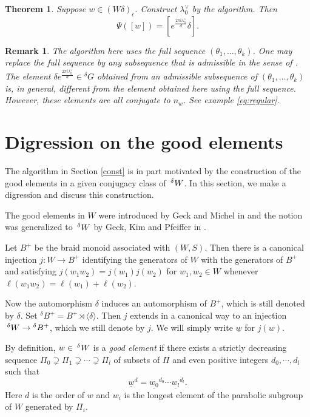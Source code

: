 \documentclass[10pt,leqno]{article}
\newtheorem{theorem}[equation]{Theorem}
\newtheorem{remark}[equation]{Remark}
{\theorembodyfont{\rmfamily}
\newtheorem{theoremplain}[equation]{Theorem}
\newtheorem{remarkplain}[equation]{Remark}
\newtheorem{editorialremarkplain}[equation]{Editorial Remark}
\newtheorem{exampleplain}[equation]{Example}
\newtheorem{corollaryplain}[equation]{Corollary}
}
\newcommand{\ch}[1]{#1^\vee}
\renewcommand{\sec}[1]{\section{#1}
\renewcommand{\theequation}{\thesection.\arabic{equation}}
  \setcounter{equation}{0}}
\newcommand{\e}{\text{e}}
\newcommand{\Wext}{\negthinspace\negthinspace\phantom{a}^\delta W}
\def\d{\delta}
\def\e{\epsilon}
\def\th{\theta}
\renewcommand{\sec}[1]{\section{#1}
\renewcommand{\theequation}{\thesection.\arabic{equation}}
  \setcounter{equation}{0}}
\begin{document}
\begin{theorem}
\label{t:main}
Suppose $w\in (W\delta)_\e$. Construct $\ch\lambda_0$ by the algorithm. Then
$$
\Psi([w])=[e^{\frac{2\pi i\ch\lambda_0}d}\delta].
$$
\end{theorem}
\begin{remark}
The algorithm here uses the full sequence $(\th_1, \ldots,
\th_k)$.
One may replace the full sequence by any subsequence that is
admissible in the sense of \cite[subsection 5.2]{he_nie_minimal_finite}. The element
$\delta e^{\frac{2\pi i\ch\lambda_0}d} \in {}^\d G$ obtained from an
admissible subsequence of $(\th_1, \ldots, \th_k)$ is, in general,
different from the element obtained here using the full
sequence. However, these elements are all conjugate to $n_w$. See
example \ref{eg:regular}.
\end{remark}



\sec{Digression on the good elements}

The algorithm in Section \ref{const} is in part motivated by
the construction of the good elements in a given conjugacy class of
$\Wext$. In this section, we make a digression and discuss this
construction.

The good elements in $W$ were introduced by Geck and Michel in
\cite{geck_michel_good} and the notion was generalized to $\Wext$ by Geck, Kim and
Pfeiffer in \cite{gkp}.

Let $B^+$ be the braid monoid associated with $(W,S)$. Then there is a
canonical injection $j:W\longrightarrow B^+$ identifying the
generators of $W$ with the generators of $B^+$ and
satisfying $j(w_1w_2)=j(w_1)j(w_2)$ for $w_1,w_2\in W$ whenever
$\ell(w_1w_2)=\ell(w_1)+\ell(w_2)$.

Now the automorphism $\delta$ induces an automorphism of $B^+$, which
is still denoted by $\delta$. Set ${}^{\delta} B^+=B^+ \rtimes
\langle\delta\rangle$. Then $j$ extends in a canonical way to an
injection $\Wext \to {}^{\delta} B^+$, which we still denote by
$j$. We will simply write $\underline w$ for $j(w)$.

By definition, $w \in \Wext$ is a {\it good element} if there exists a
strictly decreasing sequence $\Pi_0 \supsetneq \Pi_1 \supsetneq \cdots
\supsetneq \Pi_l$ of subsets of $\Pi$ and even positive integers
$d_0,\cdots,d_l$ such
that $${\underline{w}}^d=\underline{w_0}^{d_0}\cdots\underline{w_l}^{d_l}.$$
Here $d$ is the order of $w$ and $w_i$ is the longest element of the
parabolic subgroup of $W$ generated by $\Pi_i$.
\end{document}
